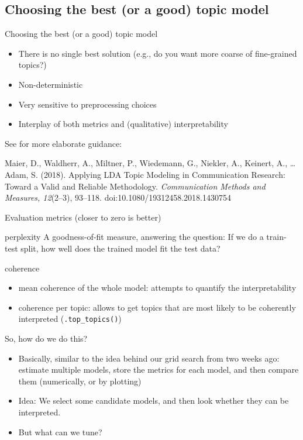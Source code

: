 \documentclass[handout]{beamer}
\begin{document}
\subsection{Choosing the best (or a good) topic model}

\begin{frame}{Choosing the best (or a good) topic model}
	\begin{itemize}
		\item There is no single best solution (e.g., do you want more coarse of fine-grained topics?)
		\item Non-deterministic
		\item Very sensitive to preprocessing choices
		\item Interplay of both metrics and (qualitative) interpretability 
	\end{itemize}
	
	See for more elaborate guidance:
	
	\tiny{Maier, D., Waldherr, A., Miltner, P., Wiedemann, G., Niekler, A., Keinert, A., \ldots Adam, S. (2018). Applying LDA Topic Modeling in Communication Research: Toward a Valid and Reliable Methodology. \textit{Communication Methods and Measures, 12}(2--3), 93--118. doi:10.1080/19312458.2018.1430754}
	
\end{frame}



\begin{frame}{Evaluation metrics (closer to zero is better)}
	\begin{block}{perplexity}
		A goodness-of-fit measure, answering the question: If we do a train-test split, how well does the trained model fit the test data?
	\end{block}
	
	\pause 
	\begin{block}{coherence}
		\begin{itemize}
			\item mean coherence of the whole model: attempts to quantify the interpretability
			\item coherence per topic: allows to get topics that are most likely to be coherently interpreted (\texttt{.top\_topics()})
		\end{itemize}
	\end{block}
	
\end{frame}


\begin{frame}{So, how do we do this?}
	\begin{itemize}[<+->]
		\item Basically, similar to the idea behind our grid search from two weeks ago: estimate multiple models, store the metrics for each model, and then compare them (numerically, or by plotting)
		\item Idea: We select some candidate models, and then look whether they can be interpreted.
		\item But what can we tune?
	\end{itemize}
\end{frame}
\end{document}
